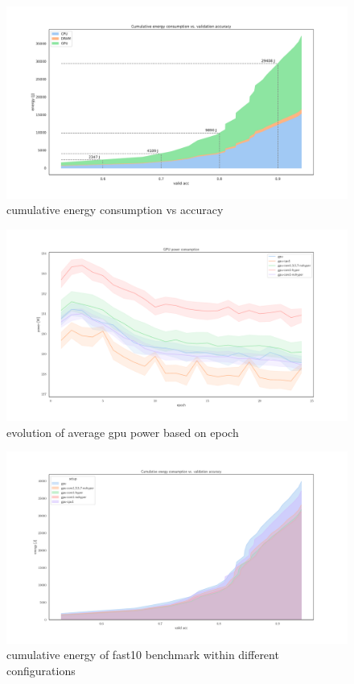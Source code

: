 \begin{figure}
    \centering
    \includegraphics[width=\linewidth]{imgs/cumulative_energy_vs_accuracy}
    \caption{cumulative energy consumption vs accuracy
    }
    \label{fig:cum_energy_vs_accuracy}
\end{figure}
\begin{figure}
    \centering
    \includegraphics[width=\linewidth]{imgs/power_gpu_baedonepoche}
    \caption{evolution of average gpu power based on epoch  }
    \label{fig:p2}
\end{figure}
\begin{figure}
    \centering
    \includegraphics[width=\linewidth]{imgs/cumulative_energy_fast10}
    \caption{cumulative energy of fast10 benchmark within different configurations }
    \label{fig:p2}
\end{figure}



